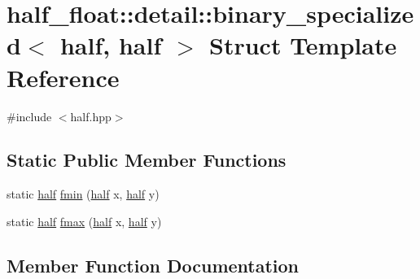 \hypertarget{structhalf__float_1_1detail_1_1binary__specialized_3_01half_00_01half_01_4}{}\section{half\+\_\+float\+:\+:detail\+:\+:binary\+\_\+specialized$<$ half, half $>$ Struct Template Reference}
\label{structhalf__float_1_1detail_1_1binary__specialized_3_01half_00_01half_01_4}


{\ttfamily \#include $<$half.\+hpp$>$}

\subsection*{Static Public Member Functions}
\begin{DoxyCompactItemize}
\item 
static \hyperlink{classhalf__float_1_1half}{half} \hyperlink{structhalf__float_1_1detail_1_1binary__specialized_3_01half_00_01half_01_4_a26cf067eeb5a5a7b20d0da1ddade32ad}{fmin} (\hyperlink{classhalf__float_1_1half}{half} x, \hyperlink{classhalf__float_1_1half}{half} y)
\item 
static \hyperlink{classhalf__float_1_1half}{half} \hyperlink{structhalf__float_1_1detail_1_1binary__specialized_3_01half_00_01half_01_4_a906748ac07462c30c52cfe7145ae307c}{fmax} (\hyperlink{classhalf__float_1_1half}{half} x, \hyperlink{classhalf__float_1_1half}{half} y)
\end{DoxyCompactItemize}


\subsection{Member Function Documentation}
\mbox{\label{structhalf__float_1_1detail_1_1binary__specialized_3_01half_00_01half_01_4_a906748ac07462c30c52cfe7145ae307c}} 
